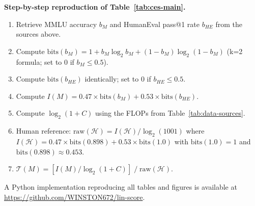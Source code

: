 \documentclass[12pt]{article}
\begin{document}
\noindent\textbf{Step-by-step reproduction of Table~\ref{tab:ces-main}.}
\begin{enumerate}
\item Retrieve MMLU accuracy $b_M$ and HumanEval pass@1 rate $b_{HE}$ from the sources above.
\item Compute $\text{bits}(b_M) = 1 + b_M \log_2 b_M + (1-b_M)\log_2(1-b_M)$ (k=2 formula; set to 0 if $b_M \leq 0.5$).
\item Compute $\text{bits}(b_{HE})$ identically; set to 0 if $b_{HE} \leq 0.5$.
\item Compute $I(M) = 0.47 \times \text{bits}(b_M) + 0.53 \times \text{bits}(b_{HE})$.
\item Compute $\log_2(1 + C)$ using the FLOPs from Table~\ref{tab:data-sources}.
\item Human reference: $\text{raw}(\mathcal{H}) = I(\mathcal{H}) / \log_2(1001)$ where $I(\mathcal{H}) = 0.47 \times \text{bits}(0.898) + 0.53 \times \text{bits}(1.0)$ with $\text{bits}(1.0)=1$ and $\text{bits}(0.898) \approx 0.453$.
\item $\mathcal{T}(M) = [I(M) / \log_2(1+C)] \;/\; \text{raw}(\mathcal{H})$.
\end{enumerate}
A Python implementation reproducing all tables and figures is available at \url{https://github.com/WINSTON672/lin-score}.
\end{document}
